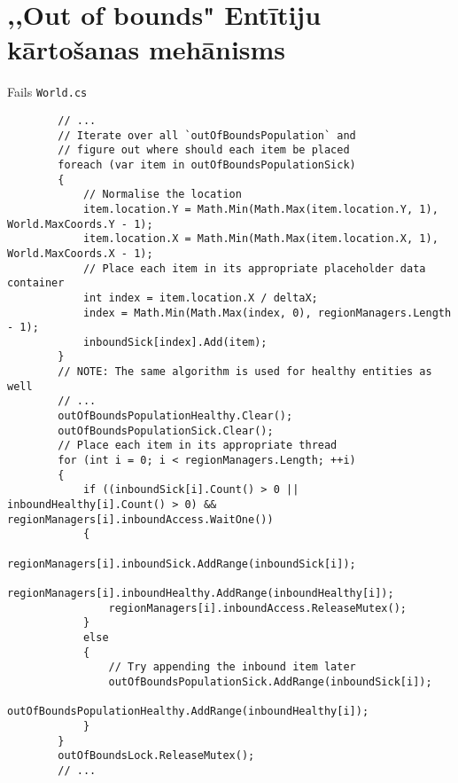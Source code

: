\section{,,Out of bounds" Entītiju kārtošanas mehānisms }
\label{app:out-of-bounds-sorting}
Fails \texttt{World.cs}
{
    \begin{verbatim}
        // ...
        // Iterate over all `outOfBoundsPopulation` and
        // figure out where should each item be placed
        foreach (var item in outOfBoundsPopulationSick)
        {
            // Normalise the location
            item.location.Y = Math.Min(Math.Max(item.location.Y, 1), World.MaxCoords.Y - 1);
            item.location.X = Math.Min(Math.Max(item.location.X, 1), World.MaxCoords.X - 1);
            // Place each item in its appropriate placeholder data container
            int index = item.location.X / deltaX;
            index = Math.Min(Math.Max(index, 0), regionManagers.Length - 1);
            inboundSick[index].Add(item);
        }
        // NOTE: The same algorithm is used for healthy entities as well
        // ...
        outOfBoundsPopulationHealthy.Clear();
        outOfBoundsPopulationSick.Clear();
        // Place each item in its appropriate thread
        for (int i = 0; i < regionManagers.Length; ++i)
        {
            if ((inboundSick[i].Count() > 0 || inboundHealthy[i].Count() > 0) && regionManagers[i].inboundAccess.WaitOne())
            {
                regionManagers[i].inboundSick.AddRange(inboundSick[i]);
                regionManagers[i].inboundHealthy.AddRange(inboundHealthy[i]);
                regionManagers[i].inboundAccess.ReleaseMutex();
            }
            else
            {
                // Try appending the inbound item later
                outOfBoundsPopulationSick.AddRange(inboundSick[i]);
                outOfBoundsPopulationHealthy.AddRange(inboundHealthy[i]);
            }
        }
        outOfBoundsLock.ReleaseMutex();
        // ...
    \end{verbatim}
}



